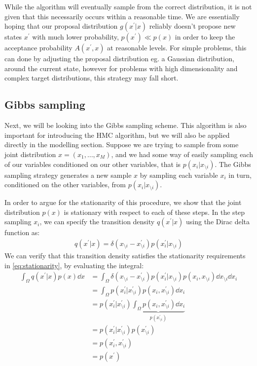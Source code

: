 While the  algorithm will eventually sample from the correct distribution, it is not given that this necessarily occurs within a reasonable time. 
We are essentially hoping that our proposal distribution $g(x^\prime | x)$ reliably doesn't propose new states $x^\prime$ with much lower probability, $p(x^\prime) \ll p(x) $ in order to keep the acceptance probability $A(x^\prime, x)$ at reasonable levels. 
For simple problems, this can done by adjusting the proposal distribution eg. a Gaussian distribution, around the current state, however for problems with high dimensionality and complex target distributions, this strategy may fall short.

\subsection{Gibbs sampling}
Next, we will be looking into the Gibbs sampling scheme.
This algorithm is also important for introducing the HMC algorithm, but we will also be applied directly in the modelling section.
Suppose we are trying to sample from some joint distribution $x=(x_1,\dots, x_M)$, and we had some way of easily sampling each of our variables conditioned on our other variables, that is $p(x_i|x_{\setminus i})$.
The Gibbs sampling strategy generates a new sample $x$ by sampling each variable $x_i$ in turn, conditioned on the other variables, from $p(x_i|x_{\setminus i})$.  

In order to argue for the stationarity of this procedure, we show that the joint distribution $p(x)$ is stationary with respect to each of these steps. 
In the step sampling $x_i$, we can specify the transition density $q(x^\prime| x)$ using the Dirac delta function as:
\begin{align}
    q(x^\prime| x) = \delta(x_{\setminus i} -x^\prime_{\setminus i}) p(x_i^\prime|x_{\setminus i})
\end{align}
We can verify that this transition density satisfies the stationarity requirements in \cref{eq:stationarity}, by evaluating the integral:
\begin{align}
    \int_{\Omega} q(x^\prime| x) p(x) \dd{x}  
    &= \int_{\Omega}   \delta(x_{\setminus i} -x^\prime_{\setminus i}) p(x_i^\prime|x_{\setminus i}) p(x_i,x_{\setminus i}) \dd{x_{\setminus i}} \dd{x_i} \\
    &= \int_{\Omega} p(x^\prime_i|x^\prime_{\setminus i}) p(x_i,x^\prime_{\setminus i}) \dd{x_i} \\ 
    &= p(x^\prime_i|x^\prime_{\setminus i}) \underbrace{\int_{\Omega}  p(x_i,x^\prime_{\setminus i}) \dd{x_i}}_{p(x^\prime_{\setminus i})} \\ 
    &= p(x^\prime_i|x^\prime_{\setminus i}) p(x^\prime_{\setminus i})  \\
    &=  p(x^\prime_i,x^\prime_{\setminus i})  \\
    &= p(x^\prime)
\end{align}

